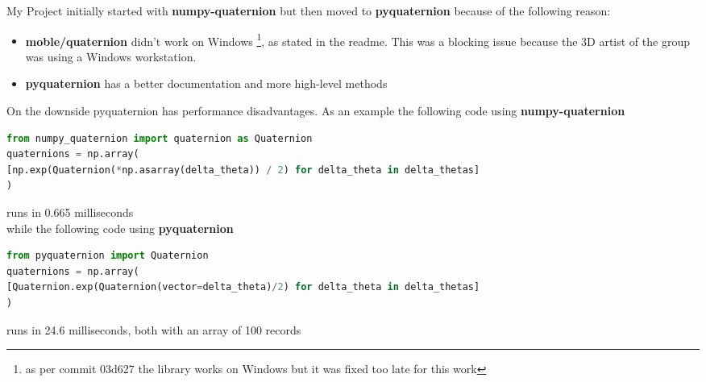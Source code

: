 My Project initially started with \textbf{numpy-quaternion} \cite{numpy-quaternion} but then moved to \textbf{pyquaternion} \cite{pyquaternion} because of the following reason:
\begin{itemize}
\item \textbf{moble/quaternion} didn't work on Windows \footnote{ as per commit 03d627 the library works on Windows but it was fixed too late for this work}, as stated in the readme. This was a blocking issue because the 3D artist of the group was using a Windows workstation.
\item \textbf{pyquaternion} has a better documentation and more high-level methods
\end{itemize}

On the downside pyquaternion has performance disadvantages. As an example the following code using \textbf{numpy-quaternion}
\begin{changemargin}{-1cm}{-1cm}
\begin{lstlisting}[language=Python,frame=single]
from numpy_quaternion import quaternion as Quaternion
quaternions = np.array(
[np.exp(Quaternion(*np.asarray(delta_theta)) / 2) for delta_theta in delta_thetas]
)
\end{lstlisting}
\end{changemargin}
runs in 0.665 milliseconds \\
while the following code using \textbf{pyquaternion} 
\begin{changemargin}{-1cm}{-1cm}
\begin{lstlisting}[language=Python,frame=single]
from pyquaternion import Quaternion
quaternions = np.array(
[Quaternion.exp(Quaternion(vector=delta_theta)/2) for delta_theta in delta_thetas]
)
\end{lstlisting}
\end{changemargin}
runs in 24.6 milliseconds, both with an array of 100 records